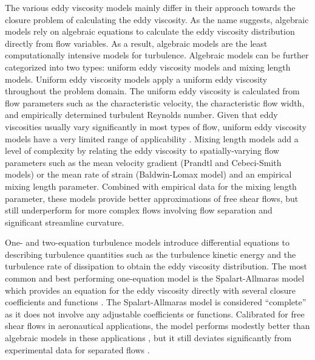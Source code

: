 The various eddy viscosity models mainly differ in their approach towards
the closure problem of calculating the eddy viscosity. As the name suggests,
algebraic models rely on algebraic equations to calculate the eddy viscosity
distribution directly from flow variables. As a result, algebraic models are
the least computationally intensive models for turbulence. Algebraic models
can be further categorized into two types: uniform eddy viscosity models
and mixing length models. Uniform eddy viscosity models apply a uniform eddy
viscosity throughout the problem domain. The uniform eddy viscosity is
calculated from flow parameters such as the characteristic velocity, the
characteristic flow width, and empirically determined turbulent Reynolds
number. Given that eddy viscosities usually vary significantly in most types of
flow, uniform eddy viscosity models have a very limited range of applicability
\cite{pope_turbulent_2000}. Mixing length models add a level of complexity by
relating the eddy viscosity to spatially-varying flow parameters such as the
mean velocity gradient (Prandtl \cite{prandtl_7_1925} and Cebeci-Smith
\cite{smith_numerical_1967} models) or the mean rate of strain (Baldwin-Lomax
\cite{baldwin_thin-layer_1978} model) and an empirical mixing length parameter.
Combined with empirical data for the mixing length parameter, these
models provide better approximations of free shear flows, but still
underperform for more complex flows involving flow separation and significant streamline curvature.

One- and two-equation turbulence models introduce differential equations to
describing turbulence quantities such as the turbulence kinetic energy and the
turbulence rate of dissipation to obtain the eddy viscosity distribution. The
most common and best performing one-equation model is the Spalart-Allmaras
model which provides an equation for the eddy viscosity directly with several
closure coefficients and functions \cite{wilcox_turbulence_2006}. The
Spalart-Allmaras model is considered ``complete'' as it does not involve any
adjustable coefficients or functions. Calibrated for free shear flows in
aeronautical applications, the model performs modestly better than algebraic
models in these applications \cite{pope_turbulent_2000}, but it still deviates
significantly from experimental data
for separated flows \cite{wilcox_turbulence_2006}.

